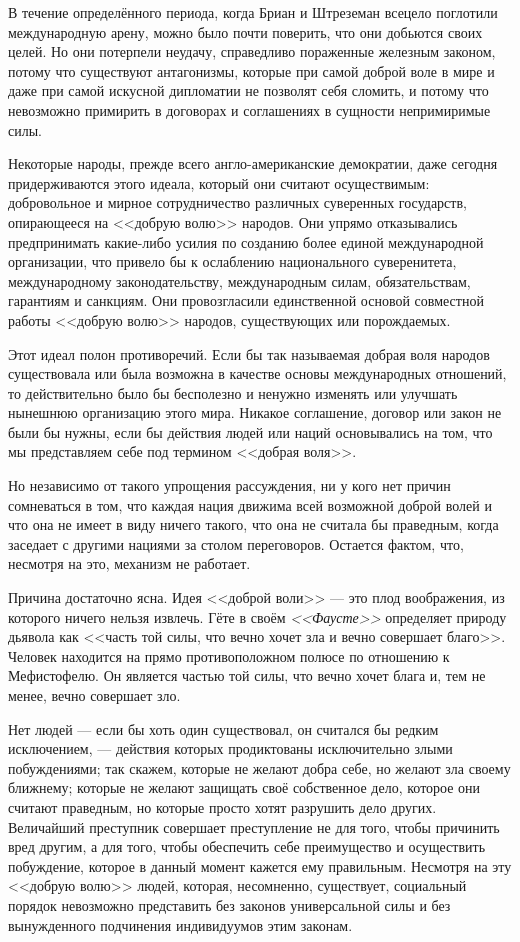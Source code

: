 В течение определённого периода, когда Бриан и Штреземан всецело поглотили международную арену, можно было почти поверить, что они добьются своих целей. Но они потерпели неудачу, справедливо пораженные железным законом, потому что существуют антагонизмы, которые при самой доброй воле в мире и даже при самой искусной дипломатии не позволят себя сломить, и потому что невозможно примирить в договорах и соглашениях в сущности непримиримые силы.

Некоторые народы, прежде всего англо-американские демократии, даже сегодня придерживаются этого идеала, который они считают осуществимым: добровольное и мирное сотрудничество различных суверенных государств, опирающееся на <<добрую волю>> народов. Они упрямо отказывались предпринимать какие-либо усилия по созданию более единой международной организации, что привело бы к ослаблению национального суверенитета, международному законодательству, международным силам, обязательствам, гарантиям и санкциям. Они провозгласили единственной основой совместной работы <<добрую волю>> народов, существующих или порождаемых.

Этот идеал полон противоречий. Если бы так называемая добрая воля народов существовала или была возможна в качестве основы международных отношений, то действительно было бы бесполезно и ненужно изменять или улучшать нынешнюю организацию этого мира. Никакое соглашение, договор или закон не были бы нужны, если бы действия людей или наций основывались на том, что мы представляем себе под термином <<добрая воля>>.

Но независимо от такого упрощения рассуждения, ни у кого нет причин сомневаться в том, что каждая нация движима всей возможной доброй волей и что она не имеет в виду ничего такого, что она не считала бы праведным, когда заседает с другими нациями за столом переговоров. Остается фактом, что, несмотря на это, механизм не работает.

Причина достаточно ясна. Идея <<доброй воли>> — это плод воображения, из которого ничего нельзя извлечь. Гёте в своём \textit{<<Фаусте>>} определяет природу дьявола как <<часть той силы, что вечно хочет зла и вечно совершает благо>>. Человек находится на прямо противоположном полюсе по отношению к Мефистофелю. Он является частью той силы, что вечно хочет блага и, тем не менее, вечно совершает зло.

Нет людей — если бы хоть один существовал, он считался бы редким исключением, — действия которых продиктованы исключительно злыми побуждениями; так скажем, которые не желают добра себе, но желают зла своему ближнему; которые не желают защищать своё собственное дело, которое они считают праведным, но которые просто хотят разрушить дело других. Величайший преступник совершает преступление не для того, чтобы причинить вред другим, а для того, чтобы обеспечить себе преимущество и осуществить побуждение, которое в данный момент кажется ему правильным. Несмотря на эту <<добрую волю>> людей, которая, несомненно, существует, социальный порядок невозможно представить без законов универсальной силы и без вынужденного подчинения индивидуумов этим законам.

